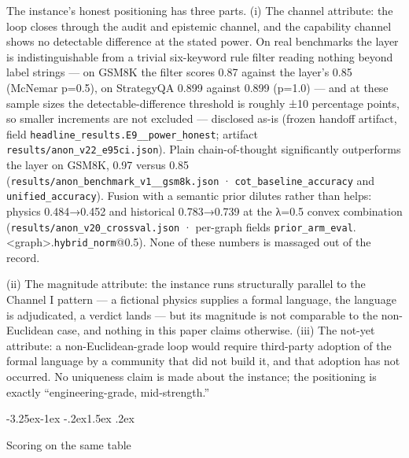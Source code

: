 \documentclass[11pt,a4paper]{article}
\makeatletter
\renewcommand\subsection{\@startsection{subsection}{2}{\z@}%
  {-3.25ex\@plus -1ex \@minus -.2ex}{1.5ex \@plus .2ex}%
  {\normalfont\large\bfseries\raggedright}}
\makeatother
\begin{document}
The instance's honest positioning has three parts. (i) The channel attribute: the loop closes through the audit and epistemic channel, and the capability channel shows no detectable difference at the stated power. On real benchmarks the layer is indistinguishable from a trivial six-keyword rule filter reading nothing beyond label strings — on GSM8K the filter scores 0.87 against the layer's 0.85 (McNemar p=0.5), on StrategyQA 0.899 against 0.899 (p=1.0) — and at these sample sizes the detectable-difference threshold is roughly ±10 percentage points, so smaller increments are not excluded — disclosed as-is (frozen handoff artifact, field \texttt{headline\_\allowbreak results.E9\_\_\allowbreak power\_\allowbreak honest}; artifact \texttt{results/\allowbreak anon\_\allowbreak v22\_\allowbreak e95ci.json}). Plain chain-of-thought significantly outperforms the layer on GSM8K, 0.97 versus 0.85 (\texttt{results/\allowbreak anon\_\allowbreak benchmark\_\allowbreak v1\_\_\allowbreak gsm8k.json} · \texttt{cot\_\allowbreak baseline\_\allowbreak accuracy} and \texttt{unified\_\allowbreak accuracy}). Fusion with a semantic prior dilutes rather than helps: physics 0.484→0.452 and historical 0.783→0.739 at the λ=0.5 convex combination (\texttt{results/\allowbreak anon\_\allowbreak v20\_\allowbreak crossval.json} · per-graph fields \texttt{prior\_\allowbreak arm\_\allowbreak eval}.<graph>.\texttt{hybrid\_\allowbreak norm}@0.5). None of these numbers is massaged out of the record.

(ii) The magnitude attribute: the instance runs structurally parallel to the Channel I pattern — a fictional physics supplies a formal language, the language is adjudicated, a verdict lands — but its magnitude is not comparable to the non-Euclidean case, and nothing in this paper claims otherwise. (iii) The not-yet attribute: a non-Euclidean-grade loop would require third-party adoption of the formal language by a community that did not build it, and that adoption has not occurred. No uniqueness claim is made about the instance; the positioning is exactly ``engineering-grade, mid-strength.''

\subsection{Scoring on the same table}
\end{document}

